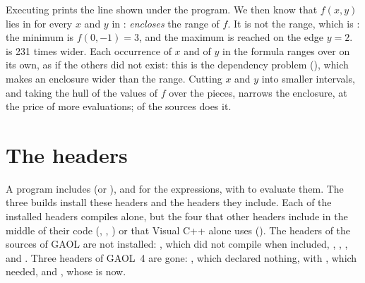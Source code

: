 \documentclass[12pt,a4paper,twoside,openright]{book}
\begin{document}
Executing  prints the line shown under the program. We then know that
$f(x,y)$ lies in  for every $x$ and $y$ in
:  \emph{encloses} the range of $f$. It is not the range,
which is : the minimum is $f(0,-1)=3$, and the
maximum is reached on the edge $y=2$.  is 231 times wider. Each
occurrence of $x$ and of $y$ in the formula ranges over  on its
own, as if the others did not exist: this is the dependency problem
(), which makes an enclosure wider than the range.
%
Cutting $x$ and $y$ into smaller intervals, and taking the hull of the values
of $f$ over the pieces, narrows the enclosure, at the price of more
evaluations;  of the sources does
it.

\section{The headers}\label{sec:headers}
%

A program includes  (or ), and
 for the expressions, with
 to evaluate them. The three builds
install these headers and the headers they include. Each of the installed
headers compiles alone, but the four that other headers include in the middle
of their code (,
,
) or that Visual C++ alone uses
(). The headers of the sources of GAOL are not
installed:\newinvfive{} , which did
not compile when included, ,
, ,
 and .
Three headers of GAOL~4 are gone: , which declared
nothing,  with , which 
needed, and , whose  is
 now.
\end{document}
